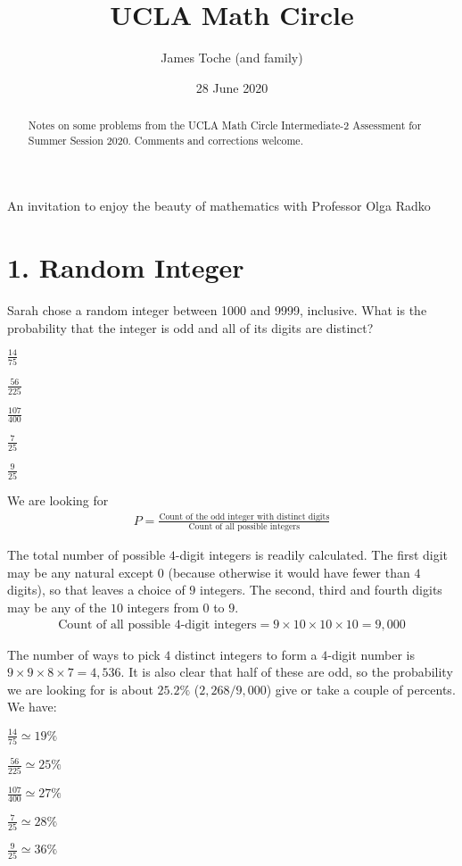 \documentclass[12pt]{article}
\title{UCLA Math Circle}
\author{James Toche (and family)}
\date{28 June 2020}
\begin{document}
\epigraph{An invitation to enjoy the beauty of mathematics with Professor Olga Radko}{}
\begin{minipage}{\textwidth}
\maketitle
\begin{abstract}
Notes on some problems from the UCLA Math Circle Intermediate-2 Assessment for Summer Session 2020. Comments and corrections welcome. 
\end{abstract}
\end{minipage}

\section*{1. Random Integer}
\begin{question}
Sarah chose a random integer between 1000 and 9999, inclusive. What is the probability that the integer is odd and all of its digits are distinct?
\begin{enumerate*}
  \item $\frac{14}{75}$
  \item $\frac{56}{225}$
  \item $\frac{107}{400}$
  \item $\frac{7}{25}$
  \item $\frac{9}{25}$
\end{enumerate*}
\end{question}

We are looking for
\begin{align*}
P = \frac{\text{Count of the odd integer with distinct digits}}{\text{Count of all possible integers}}
\end{align*}

The total number of possible $4$-digit integers is readily calculated. The first digit may be any natural except $0$ (because otherwise it would have fewer than $4$ digits), so that leaves a choice of $9$ integers. The second, third and fourth digits may be any of the $10$ integers from $0$ to $9$. 
\begin{align*}
\text{Count of all possible 4-digit integers} = 9 \times 10 \times 10 \times 10 = 9,000
\end{align*}

The number of ways to pick $4$ distinct integers to form a $4$-digit number is $9\times9\times8\times7=4,536$. It is also clear that half of these are odd, so the probability we are looking for is about $25.2\%$ ($2,268/9,000$) give or take a couple of percents. We have:
\begin{question}
\begin{enumerate*}
  \item $\frac{14}{75} \simeq 19\%$
  \item $\frac{56}{225} \simeq 25\%$
  \item $\frac{107}{400} \simeq 27\%$
  \item $\frac{7}{25} \simeq 28\%$
  \item $\frac{9}{25} \simeq 36\%$
\end{enumerate*}
\end{question}
\end{document}
